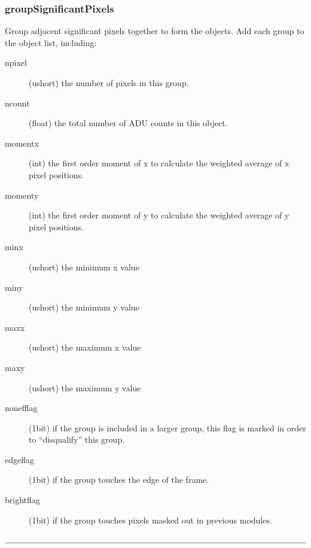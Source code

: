 \subsubsection{groupSignificantPixels}

\begin{descrip}
Group adjacent significant pixels together to form the objects.
Add each group to the object list, including:
\begin{description}
\item[\quad npixel](ushort) the number of pixels in this group.
\item[\quad ncount](float) the total number of ADU counts in this object.
\item[\quad momentx](int) the first order moment of x to calculate the 
    weighted average of x pixel positions.
\item[\quad momenty](int) the first order moment of y to calculate the 
    weighted average of y pixel positions.
\item[\quad minx](ushort) the minimum x value
\item[\quad miny](ushort) the minimum y value
\item[\quad maxx](ushort) the maximum x value
\item[\quad maxy](ushort) the maximum y value
\item[\quad nonefflag](1bit) if the group is included in a 
    larger group, this flag is marked in order to ``disqualify'' this group. 
\item[\quad edgeflag](1bit) if the group touches the edge of the frame.
\item[\quad brightflag](1bit) if the group touches pixels masked 
    out in previous modules.
\end{description}
\end{descrip}


\begin{verbatim}
__________________________________________________________________________
\end{verbatim}

